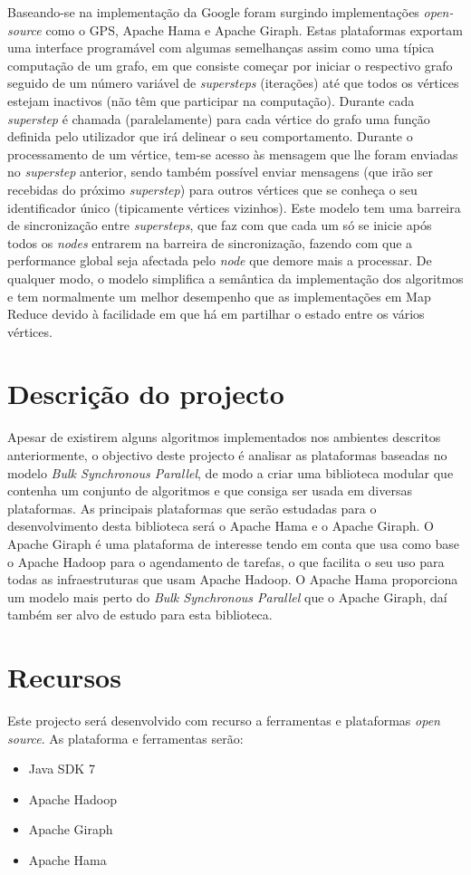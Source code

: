 Baseando-se na implementação da Google foram surgindo implementações \textit{open-source} como o GPS\cite{docgps}, Apache Hama\cite{hama} e Apache Giraph\cite{giraph}.
Estas plataformas exportam uma interface programável com algumas semelhanças assim como uma típica computação de um grafo, em que consiste começar por iniciar o respectivo grafo seguido de um número variável de \textit{supersteps} (iterações) até que todos os vértices estejam inactivos (não têm que participar na computação).
Durante cada \textit{superstep} é chamada (paralelamente) para cada vértice do grafo uma função definida pelo utilizador que irá delinear o seu comportamento.
Durante o processamento de um vértice, tem-se acesso às mensagem que lhe foram enviadas no \textit{superstep} anterior, sendo também possível enviar mensagens (que irão ser recebidas do próximo \textit{superstep}) para outros vértices que se conheça o seu identificador único (tipicamente vértices vizinhos).
Este modelo tem uma barreira de sincronização entre \textit{supersteps}, que faz com que cada um só se inicie após todos os \textit{nodes} entrarem na barreira de sincronização, fazendo com que a performance global seja afectada pelo \textit{node} que demore mais a processar.
De qualquer modo, o modelo simplifica a semântica da implementação dos algoritmos e tem normalmente um melhor desempenho que as implementações em Map Reduce devido à facilidade em que há em partilhar o estado entre os vários vértices. 


\section{Descrição do projecto}
Apesar de existirem alguns algoritmos implementados nos ambientes descritos anteriormente, o objectivo deste projecto é analisar as plataformas
baseadas no modelo \textit{Bulk Synchronous Parallel}, de modo a criar uma biblioteca modular que contenha um conjunto de algoritmos e que consiga
ser usada em diversas plataformas. As principais plataformas que serão estudadas para o desenvolvimento desta biblioteca será o Apache Hama e o Apache Giraph. 
O Apache Giraph é uma plataforma de interesse tendo em conta que usa como base o Apache Hadoop para o agendamento de tarefas, o que facilita o seu uso
para todas as infraestruturas que usam Apache Hadoop. O Apache Hama proporciona um modelo mais perto do \textit{Bulk Synchronous Parallel} que o Apache Giraph, daí também ser
alvo de estudo para esta biblioteca.


\section{Recursos}
Este projecto será desenvolvido com recurso a ferramentas e plataformas \textit{open source}.
As plataforma e ferramentas serão:
\begin{itemize}
 \item Java SDK 7
 \item Apache Hadoop
 \item Apache Giraph
 \item Apache Hama
\end{itemize}

